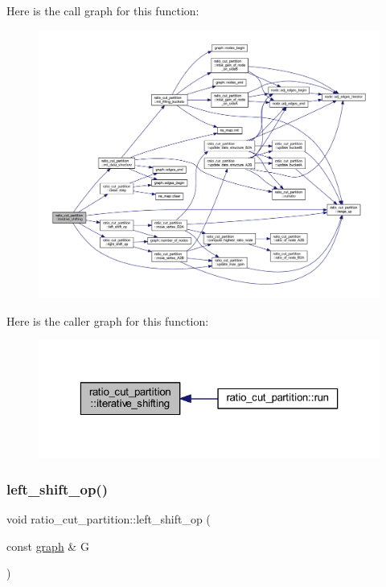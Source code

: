 Here is the call graph for this function\+:\nopagebreak
\begin{figure}[H]
\begin{center}
\leavevmode
\includegraphics[width=350pt]{classratio__cut__partition_a758382177ff8be996d0be78a3cca069b_cgraph}
\end{center}
\end{figure}
Here is the caller graph for this function\+:\nopagebreak
\begin{figure}[H]
\begin{center}
\leavevmode
\includegraphics[width=323pt]{classratio__cut__partition_a758382177ff8be996d0be78a3cca069b_icgraph}
\end{center}
\end{figure}
\mbox{\label{classratio__cut__partition_af736bd4e468935c1b1642f78d3df665d}} 
\subsubsection{\texorpdfstring{left\+\_\+shift\+\_\+op()}{left\_shift\_op()}}
{\footnotesize\ttfamily void ratio\+\_\+cut\+\_\+partition\+::left\+\_\+shift\+\_\+op (\begin{DoxyParamCaption}\item[{const \mbox{\hyperlink{classgraph}{graph}} \&}]{G }\end{DoxyParamCaption})\hspace{0.3cm}{\ttfamily [protected]}}



